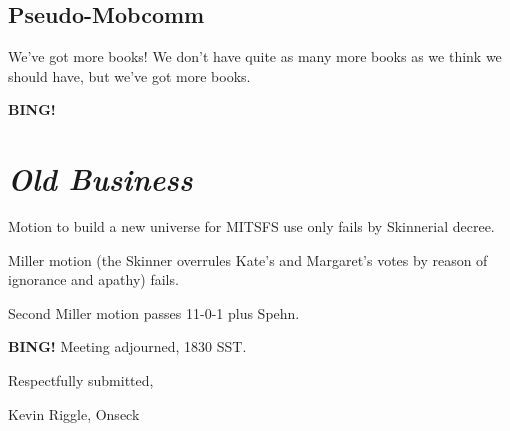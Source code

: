 \documentclass[10pt]{article}
\newcommand{\bing}{{\bf BING!} }
\newcommand{\goto}[1]{\bing \vskip 12pt \section*{{\em{#1}}}}
\newcommand{\ps}{ plus Spehn\xspace}
\begin{document}
\subsection*{Pseudo-Mobcomm}
We've got more books!  We don't have quite as many more books as we think we should have, but we've
got more books.



\goto{Old Business}

Motion to build a new universe for MITSFS use only fails by Skinnerial decree.

Miller motion (the Skinner overrules Kate's and Margaret's votes by reason of ignorance and apathy)
fails.

Second Miller motion passes 11-0-1\ps.

\bing
\noindent
Meeting adjourned, 1830 SST.

\vspace{18pt}

\centerline{Respectfully submitted,}
\centerline{Kevin Riggle, Onseck}
\end{document}
